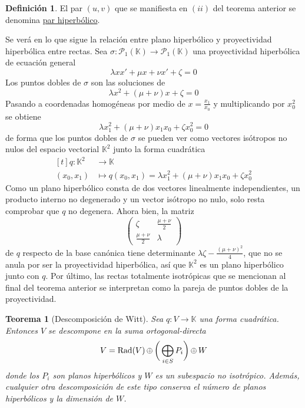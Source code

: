 \documentclass[12pt]{report}
\newtheorem{theorem}{Teorema}[chapter]
\theoremstyle{definition}
\newtheorem{definition}{Definición}[chapter]
\theoremstyle{definition}
\theoremstyle{remark}
\begin{document}
\begin{definition}
El par $(u,v)$ que se manifiesta en $(ii)$ del teorema anterior se denomina \ul{par hiperbólico}.
\end{definition}

Se verá en lo que sigue la relación entre plano hiperbólico y proyectividad hiperbólica entre rectas. Sea $\sigma \colon \mathcal{P}_1(\mathbb{K}) \to \mathcal{P}_1(\mathbb{K})$ una proyectividad hiperbólica de ecuación general 
\[\lambda x x'+\mu x +\nu x' + \zeta = 0\]
Los puntos dobles de $\sigma$ son las soluciones de
\[\lambda x^2+(\mu+\nu)x+\zeta = 0\]
Pasando a coordenadas homogéneas por medio de $x = \frac{x_1}{x_0}$ y multiplicando por $x_0^2$ se obtiene
\[\lambda x_1^2 +(\mu+\nu)x_1x_0 + \zeta x_0^2 = 0\]
de forma que los puntos dobles de $\sigma$ se pueden ver como vectores isótropos no nulos del espacio vectorial $\mathbb{K}^2$ junto la forma cuadrática 
\[
\begin{aligned}[t]
q \colon \mathbb{K}^2 &\longrightarrow \mathbb{K} \\
(x_0, x_1) &\longmapsto q(x_0,x_1) = \lambda x_1^2 +(\mu+\nu)x_1x_0 + \zeta x_0^2
\end{aligned}
\]
Como un plano hiperbólico consta de dos vectores linealmente independientes, un producto interno no degenerado y un vector isótropo no nulo, solo resta comprobar que $q$ no degenera. Ahora bien, la matriz
\[\begin{pmatrix*}
    \zeta & \frac{\mu+\nu}{2} \\
    \frac{\mu+\nu}{2} & \lambda
\end{pmatrix*}\]
de $q$ respecto de la base canónica tiene determinante $\lambda \zeta - \frac{(\mu+\nu)^2}{4}$, que no se anula por ser la proyectividad hiperbólica, así que $\mathbb{K}^2$ es un plano hiperbólico junto con $q$. Por último, las rectas totalmente isotrópicas que se mencionan al final del teorema anterior se interpretan como la pareja de puntos dobles de la proyectividad.

\begin{theorem}[Descomposición de Witt]
Sea $q \colon V \to \mathbb{K}$ una forma cuadrática. Entonces $V$ se descompone en la suma ortogonal-directa
\[V = \textup{Rad}(V) \, \oplus \, \biggr( \bigoplus_{i \in S}P_i \biggl) \, \oplus \, W\]
donde los $P_i$ son planos hiperbólicos y $W$ es un subespacio no isotrópico. Además, cualquier otra descomposición de este tipo conserva el número de planos hiperbólicos y la dimensión de $W$.
\end{theorem}
\end{document}
